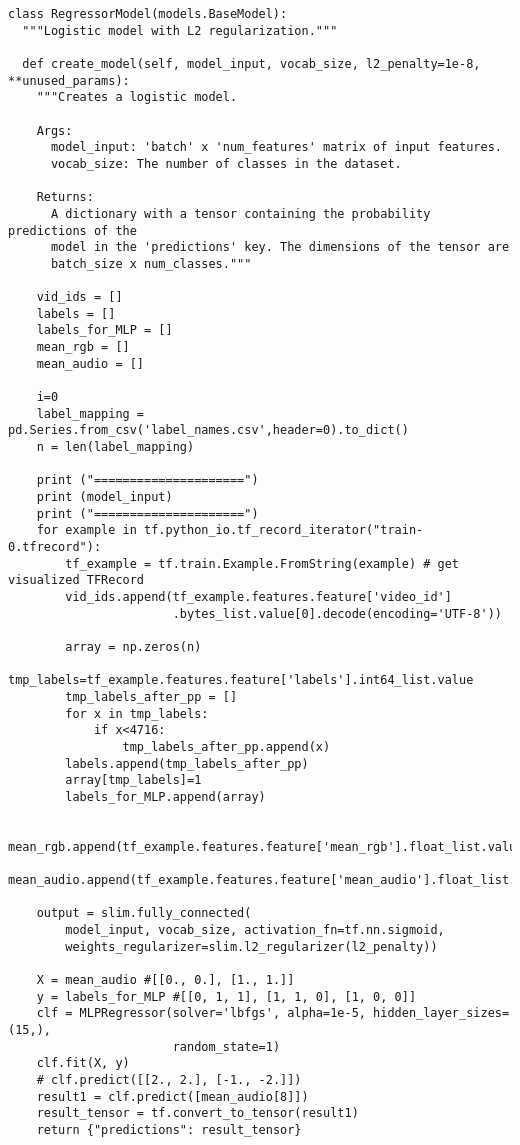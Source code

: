 \documentclass[11pt]{article}
\begin{document}
\begin{verbatim}
class RegressorModel(models.BaseModel):
  """Logistic model with L2 regularization."""

  def create_model(self, model_input, vocab_size, l2_penalty=1e-8, **unused_params):
    """Creates a logistic model.

    Args:
      model_input: 'batch' x 'num_features' matrix of input features.
      vocab_size: The number of classes in the dataset.

    Returns:
      A dictionary with a tensor containing the probability predictions of the
      model in the 'predictions' key. The dimensions of the tensor are
      batch_size x num_classes."""

    vid_ids = []
    labels = []
    labels_for_MLP = []
    mean_rgb = []
    mean_audio = []

    i=0
    label_mapping = pd.Series.from_csv('label_names.csv',header=0).to_dict()
    n = len(label_mapping)

    print ("=====================")
    print (model_input)
    print ("=====================")
    for example in tf.python_io.tf_record_iterator("train-0.tfrecord"):
        tf_example = tf.train.Example.FromString(example) # get visualized TFRecord
        vid_ids.append(tf_example.features.feature['video_id']
                       .bytes_list.value[0].decode(encoding='UTF-8'))

        array = np.zeros(n)
        tmp_labels=tf_example.features.feature['labels'].int64_list.value
        tmp_labels_after_pp = []
        for x in tmp_labels:
            if x<4716:
                tmp_labels_after_pp.append(x)
        labels.append(tmp_labels_after_pp)
        array[tmp_labels]=1
        labels_for_MLP.append(array)

        mean_rgb.append(tf_example.features.feature['mean_rgb'].float_list.value)
        mean_audio.append(tf_example.features.feature['mean_audio'].float_list.value)

    output = slim.fully_connected(
        model_input, vocab_size, activation_fn=tf.nn.sigmoid,
        weights_regularizer=slim.l2_regularizer(l2_penalty))

    X = mean_audio #[[0., 0.], [1., 1.]]
    y = labels_for_MLP #[[0, 1, 1], [1, 1, 0], [1, 0, 0]]
    clf = MLPRegressor(solver='lbfgs', alpha=1e-5, hidden_layer_sizes=(15,),
                       random_state=1)
    clf.fit(X, y)
    # clf.predict([[2., 2.], [-1., -2.]])
    result1 = clf.predict([mean_audio[8]])
    result_tensor = tf.convert_to_tensor(result1)
    return {"predictions": result_tensor}
\end{verbatim}
\end{document}
